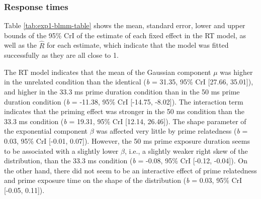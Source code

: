 \documentclass[
  english,
  man,floatsintext]{apa6}
\begin{document}
\newpage

\hypertarget{response-times}{%
\subsubsection{Response times}\label{response-times}}

Table \ref{tab:exp1-blmm-table} shows the mean, standard error, lower and upper bounds of the 95\% CrI of the estimate of each fixed effect in the RT model, as well as the \(\hat{R}\) for each estimate, which indicate that the model was fitted successfully as they are all close to 1.

The RT model indicates that the mean of the Gaussian component \(\mu\) was higher in the unrelated condition than the identical (\emph{b} = 31.35, 95\% CrI {[}27.66, 35.01{]}), and higher in the 33.3 ms prime duration condition than in the 50 ms prime duration condition (\emph{b} = -11.38, 95\% CrI {[}-14.75, -8.02{]}). The interaction term indicates that the priming effect was stronger in the 50 ms condition than the 33.3 ms condition (\emph{b} = 19.31, 95\% CrI {[}12.14, 26.46{]}). The shape parameter of the exponential component \(\beta\) was affected very little by prime relatedness (\emph{b} = 0.03, 95\% CrI {[}-0.01, 0.07{]}). However, the 50 ms prime exposure duration seems to be associated with a slightly lower \(\beta\), i.e., a slightly weaker right skew of the distribution, than the 33.3 ms condition (\emph{b} = -0.08, 95\% CrI {[}-0.12, -0.04{]}). On the other hand, there did not seem to be an interactive effect of prime relatedness and prime exposure time on the shape of the distribution (\emph{b} = 0.03, 95\% CrI {[}-0.05, 0.11{]}).
\end{document}
